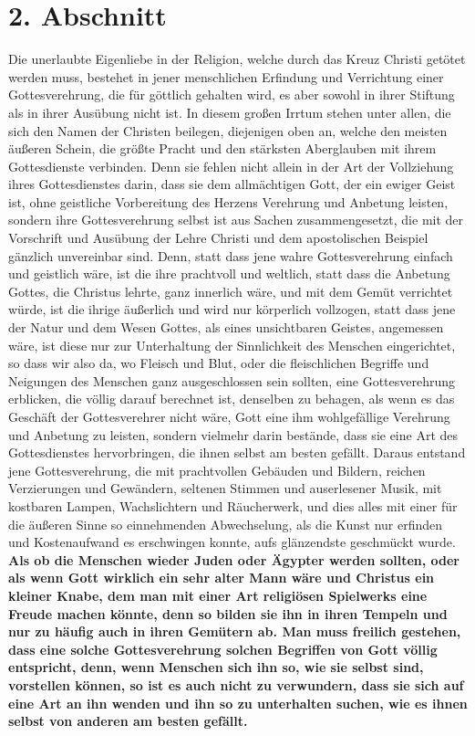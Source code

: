\section{2. Abschnitt} \label{kap5_ab2}

Die unerlaubte Eigenliebe in der Religion, welche durch das Kreuz Christi
getötet werden muss, bestehet in jener menschlichen Erfindung und Verrichtung
einer Gottesverehrung, die für göttlich gehalten wird, es aber sowohl in ihrer
Stiftung als in ihrer Ausübung nicht ist. In diesem großen Irrtum stehen unter
allen, die sich den Namen der Christen beilegen, diejenigen oben an, welche den
meisten äußeren Schein, die größte Pracht und den stärksten Aberglauben mit
ihrem Gottesdienste verbinden. Denn sie fehlen nicht allein in der Art der
Vollziehung ihres Gottesdienstes darin, dass sie dem allmächtigen Gott, der ein
ewiger Geist ist, ohne geistliche Vorbereitung 
des Herzens Verehrung und
Anbetung leisten, sondern ihre Gottesverehrung selbst ist aus Sachen
zusammengesetzt, die mit der Vorschrift und Ausübung der Lehre Christi und dem
apostolischen Beispiel gänzlich unvereinbar sind. Denn, statt dass jene wahre
Gottesverehrung einfach und geistlich wäre, ist die ihre prachtvoll und
weltlich, statt dass die Anbetung Gottes, die Christus lehrte, ganz innerlich
wäre, und mit dem Gemüt verrichtet würde, ist die ihrige äußerlich und wird
nur körperlich vollzogen, statt dass jene der Natur und dem Wesen Gottes, als
eines unsichtbaren Geistes, angemessen wäre, ist diese nur zur Unterhaltung der
Sinnlichkeit des Menschen eingerichtet, so dass wir also da, wo Fleisch und Blut,
oder die fleischlichen Begriffe und Neigungen des Menschen ganz ausgeschlossen
sein sollten, eine Gottesverehrung erblicken, die völlig darauf berechnet ist,
denselben zu behagen, als wenn es das Geschäft der Gottesverehrer nicht wäre,
Gott eine ihm wohlgefällige Verehrung und Anbetung zu leisten, sondern vielmehr
darin bestände, dass sie eine Art des Gottesdienstes hervorbringen, die ihnen
selbst am besten gefällt. Daraus entstand jene Gottesverehrung, die mit
prachtvollen Gebäuden und Bildern, reichen Verzierungen und Gewändern, seltenen
Stimmen und auserlesener Musik, mit kostbaren Lampen,
Wachslichtern und
Räucherwerk, und dies alles mit einer für die äußeren Sinne so
einnehmenden
Abwechselung, als die Kunst nur erfinden und Kostenaufwand es erschwingen
konnte, aufs glänzendste geschmückt wurde. \label{ref:05_02_kasperletheater}
\textbf{Als ob die Menschen wieder Juden
oder Ägypter  werden sollten,
oder als wenn Gott  wirklich ein sehr alter Mann
wäre und Christus ein kleiner Knabe, dem man mit einer Art religiösen
Spielwerks eine Freude machen könnte, denn so bilden sie ihn in ihren Tempeln
und nur zu häufig auch in ihren Gemütern ab. Man muss freilich gestehen, dass
eine solche Gottesverehrung solchen Begriffen von Gott völlig entspricht, denn,
wenn Menschen sich ihn so, wie sie selbst sind, vorstellen können, so ist es
auch nicht zu  verwundern, dass sie sich auf eine Art an ihn wenden und ihn so zu
unterhalten suchen, wie es ihnen selbst von anderen am besten gefällt.}

